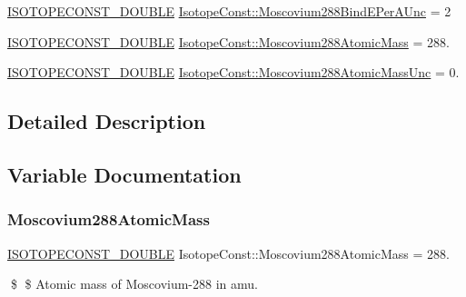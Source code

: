 \begin{DoxyCompactItemize}
\mbox{\hyperlink{group___isotope_const-_macros_ga8f45a7272ce02c0b4c65c44636ed719a}{I\+S\+O\+T\+O\+P\+E\+C\+O\+N\+S\+T\+\_\+\+D\+O\+U\+B\+LE}} \mbox{\hyperlink{group___isotope_const-_moscovium-_mc288_gab4fd668968ef8046cfdd3ef7a1d0aa21}{Isotope\+Const\+::\+Moscovium288\+Bind\+E\+Per\+A\+Unc}} = 2
\item 
\mbox{\hyperlink{group___isotope_const-_macros_ga8f45a7272ce02c0b4c65c44636ed719a}{I\+S\+O\+T\+O\+P\+E\+C\+O\+N\+S\+T\+\_\+\+D\+O\+U\+B\+LE}} \mbox{\hyperlink{group___isotope_const-_moscovium-_mc288_ga6076d6a257eb79527486d0fb7ac55e3c}{Isotope\+Const\+::\+Moscovium288\+Atomic\+Mass}} = 288.
\item 
\mbox{\hyperlink{group___isotope_const-_macros_ga8f45a7272ce02c0b4c65c44636ed719a}{I\+S\+O\+T\+O\+P\+E\+C\+O\+N\+S\+T\+\_\+\+D\+O\+U\+B\+LE}} \mbox{\hyperlink{group___isotope_const-_moscovium-_mc288_ga425a80bc7565824095cfcf5277e50e82}{Isotope\+Const\+::\+Moscovium288\+Atomic\+Mass\+Unc}} = 0.
\end{DoxyCompactItemize}


\subsection{Detailed Description}


\subsection{Variable Documentation}
\mbox{\label{group___isotope_const-_moscovium-_mc288_ga6076d6a257eb79527486d0fb7ac55e3c}} 
\subsubsection{\texorpdfstring{Moscovium288\+Atomic\+Mass}{Moscovium288AtomicMass}}
{\footnotesize\ttfamily \mbox{\hyperlink{group___isotope_const-_macros_ga8f45a7272ce02c0b4c65c44636ed719a}{I\+S\+O\+T\+O\+P\+E\+C\+O\+N\+S\+T\+\_\+\+D\+O\+U\+B\+LE}} Isotope\+Const\+::\+Moscovium288\+Atomic\+Mass = 288.}

\$ \$ Atomic mass of Moscovium-\/288 in amu. \mbox{\label{group___isotope_const-_moscovium-_mc288_ga425a80bc7565824095cfcf5277e50e82}} 
